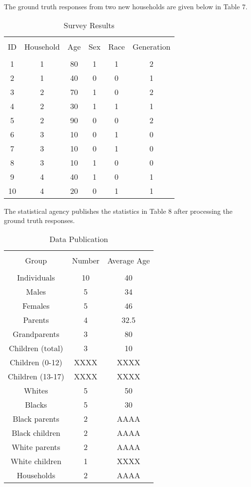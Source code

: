 \documentclass[jou,apacite]{apa6}
\begin{document}
The ground truth responses from two new households are given below in Table 7.
\begin{table}[!htb]
\caption{Survey Results}\label{tab7}
\begin{tabular}{c|c|c|c|c|c}
\hline\\[-1.5ex]
ID & Household & Age & Sex & Race & Generation \\[0.5ex]
\hline\\[-1.5ex]
1 & 1 & 80 & 1 & 1 & 2  \\[0.5ex]
2 & 1 & 40 & 0 & 0 & 1  \\[0.5ex]
3 & 2 & 70 & 1 & 0 & 2  \\[0.5ex]
4 & 2 & 30 & 1 & 1 & 1  \\[0.5ex]
5 & 2 & 90 & 0 & 0 & 2  \\[0.5ex]
6 & 3 & 10 & 0 & 1 & 0  \\[0.5ex]
7 & 3 & 10 & 0 & 1 & 0  \\[0.5ex]
8 & 3 & 10 & 1 & 0 & 0  \\[0.5ex]
9 & 4 & 40 & 1 & 0 & 1 \\[0.5ex]
10 & 4 & 20 & 0 & 1 & 1 \\[0.5ex]
\hline
\end{tabular}
\end{table}

The statistical agency publishes the statistics in Table 8 after processing the ground truth responses.

\begin{table}[!htb]
\caption{Data Publication}\label{tab8}
\begin{tabular}{ccc}
\hline\\[-1.5ex]
Group & Number & Average Age \\[0.5ex]
\hline\\[-1.5ex]
Individuals & 10 & 40 \\[0.5ex]
Males & 5 & 34 \\[0.5ex]
Females & 5 & 46 \\[0.5ex]
Parents & 4 & 32.5 \\[0.5ex]
Grandparents & 3 & 80 \\[0.5ex]
Children (total) & 3 & 10 \\[0.5ex]
Children (0-12) & XXXX & XXXX \\[0.5ex]
Children (13-17) & XXXX & XXXX \\[0.5ex]
Whites & 5 & 50 \\[0.5ex]
Blacks & 5 & 30 \\[0.5ex]
Black parents & 2 & AAAA \\[0.5ex]
Black children & 2 & AAAA\\[0.5ex]
White parents & 2 & AAAA \\[0.5ex]
White children & 1 & XXXX \\[0.5ex]
Households & 2 & AAAA \\[0.5ex]
\hline
\end{tabular}
\end{table}
\end{document}
